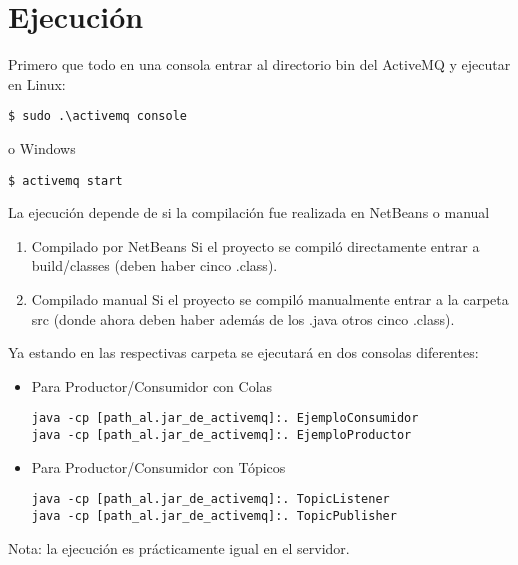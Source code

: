 \documentclass[]{article}
\begin{document}
\section{Ejecución}
Primero que todo en una consola entrar al directorio bin del ActiveMQ y ejecutar en Linux:
\begin{lstlisting}
$ sudo .\activemq console 
\end{lstlisting}
o Windows
\begin{lstlisting}
$ activemq start
\end{lstlisting}
La ejecución depende de si la compilación fue realizada en NetBeans o manual
\begin{enumerate}
\item Compilado por NetBeans
Si el proyecto se compiló directamente entrar a build/classes (deben haber cinco .class).
\item Compilado manual
Si el proyecto se compiló manualmente entrar a la carpeta src (donde ahora deben haber además de los .java otros cinco .class).
\end{enumerate}
Ya estando en las respectivas carpeta se ejecutará en dos consolas diferentes:
\begin{itemize}
\item Para Productor/Consumidor con Colas
\begin{lstlisting}
java -cp [path_al.jar_de_activemq]:. EjemploConsumidor
java -cp [path_al.jar_de_activemq]:. EjemploProductor
\end{lstlisting}
\item Para Productor/Consumidor con Tópicos
\begin{lstlisting}
java -cp [path_al.jar_de_activemq]:. TopicListener
java -cp [path_al.jar_de_activemq]:. TopicPublisher
\end{lstlisting}
\end{itemize}
Nota: la ejecución es prácticamente igual en el servidor.
\end{document}
